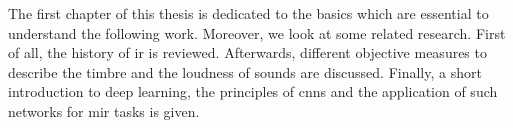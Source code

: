 The first chapter of this thesis is dedicated to the basics which are essential to understand the following work. Moreover, we look at some related research. First of all, the history of \gls{ir} is reviewed. Afterwards, different objective measures to describe the timbre and the loudness of sounds are discussed. Finally, a short introduction to deep learning, the principles of \glspl{cnn} and the application of such networks for \gls{mir} tasks is given.
